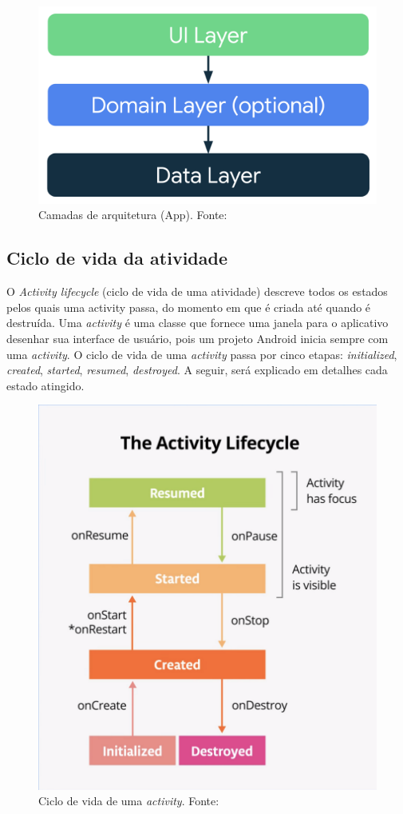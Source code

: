 \begin{figure}[ht]
    \centering
    \includegraphics[width=.63\textwidth]{img/app-android-layers.png}
    \caption{Camadas de arquitetura (App). Fonte: \cite{google-developers-guideline}}\label{figAppLayer}
\end{figure}

\subsection{Ciclo de vida da atividade}\label{ciclo-de-vida}

O \textit{Activity lifecycle} (ciclo de vida de uma atividade) descreve todos os estados pelos quais uma activity passa, do momento em que é criada
até quando é destruída. Uma \textit{activity} é uma classe que fornece uma janela para o aplicativo desenhar sua interface de usuário, pois um projeto Android 
inicia sempre com uma \textit{activity}. O ciclo de vida de uma \textit{activity} passa por cinco etapas: 
\textit{initialized}, \textit{created}, \textit{started}, \textit{resumed}, \textit{destroyed}. A seguir, será explicado em detalhes
cada estado atingido.

\begin{figure}[ht]
    \centering
    \includegraphics[width=.44\textwidth]{img/activity-lifecycle.png}
    \caption{Ciclo de vida de uma \textit{activity}. Fonte: \cite{google-developers-activity-lifecycle}}\label{figActivityLifeCycle}
\end{figure}

